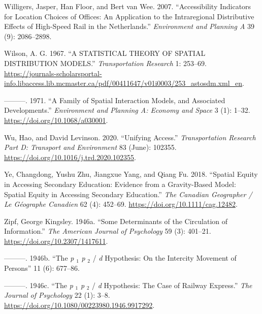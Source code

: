 \documentclass[
]{article}
\newlength{\cslhangindent}
\newenvironment{CSLReferences}[2] %
 {\begin{list}{}{%
  \setlength{\itemindent}{0pt}
  \setlength{\leftmargin}{0pt}
  \setlength{\parsep}{0pt}
  \ifodd #1
   \setlength{\leftmargin}{\cslhangindent}
   \setlength{\itemindent}{-1\cslhangindent}
  \fi
  \setlength{\itemsep}{#2\baselineskip}}}
 {\end{list}}
\begin{document}
\begin{CSLReferences}{1}{0}
Willigers, Jasper, Han Floor, and Bert van Wee. 2007. {``Accessibility
Indicators for Location Choices of Offices: An Application to the
Intraregional Distributive Effects of High-Speed Rail in the
Netherlands.''} \emph{Environment and Planning A} 39 (9): 2086--2898.

Wilson, A. G. 1967. {``A {STATISTICAL} {THEORY} {OF} {SPATIAL}
{DISTRIBUTION} {MODELS}.''} \emph{Transportation Research} 1: 253--69.
\url{https://journals-scholarsportal-info.libaccess.lib.mcmaster.ca/pdf/00411647/v01i0003/253_astosdm.xml_en}.

---------. 1971. {``A Family of Spatial Interaction Models, and
Associated Developments.''} \emph{Environment and Planning A: Economy
and Space} 3 (1): 1--32. \url{https://doi.org/10.1068/a030001}.

Wu, Hao, and David Levinson. 2020. {``Unifying Access.''}
\emph{Transportation Research Part D: Transport and Environment} 83
(June): 102355. \url{https://doi.org/10.1016/j.trd.2020.102355}.

Ye, Changdong, Yushu Zhu, Jiangxue Yang, and Qiang Fu. 2018. {``Spatial
Equity in Accessing Secondary Education: {Evidence} from a Gravity-Based
Model: {Spatial} Equity in Accessing Secondary Education.''} \emph{The
Canadian Geographer / Le Géographe Canadien} 62 (4): 452--69.
\url{https://doi.org/10.1111/cag.12482}.

Zipf, George Kingsley. 1946a. {``Some Determinants of the Circulation of
Information.''} \emph{The American Journal of Psychology} 59 (3):
401--21. \url{https://doi.org/10.2307/1417611}.

---------. 1946b. {``The \emph{p} \(_{\textrm{1}}\) \emph{p}
\(_{\textrm{2}}\) / \emph{d} Hypothesis: On the Intercity Movement of
Persons''} 11 (6): 677--86.

---------. 1946c. {``The \emph{p} \(_{\textrm{1}}\) \emph{p}
\(_{\textrm{2}}\) / \emph{d} Hypothesis: The Case of Railway Express.''}
\emph{The Journal of Psychology} 22 (1): 3--8.
\url{https://doi.org/10.1080/00223980.1946.9917292}.

\end{CSLReferences}
\end{document}
